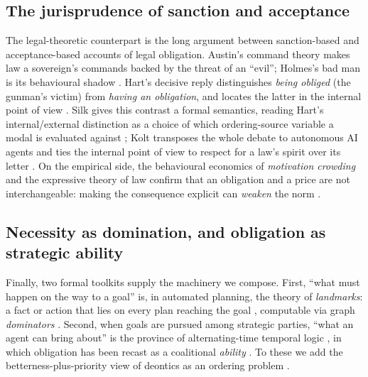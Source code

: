\subsection{The jurisprudence of sanction and acceptance}
The legal-theoretic counterpart is the long argument between sanction-based and
acceptance-based accounts of legal obligation. Austin's command theory makes law a
sovereign's commands backed by the threat of an ``evil''; Holmes's bad man is its
behavioural shadow . Hart's decisive reply distinguishes
\emph{being obliged} (the gunman's victim) from \emph{having an obligation}, and locates
the latter in the internal point of view . Silk gives this contrast a
formal semantics, reading Hart's internal/external distinction as a choice of which
ordering-source variable a modal is evaluated against ; Kolt transposes the
whole debate to autonomous AI agents and ties the internal point of view to respect for a
law's spirit over its letter . On the empirical side, the behavioural
economics of \emph{motivation crowding} and the expressive theory of law confirm that an
obligation and a price are not interchangeable: making the consequence explicit can
\emph{weaken} the norm .

\subsection{Necessity as domination, and obligation as strategic ability}
Finally, two formal toolkits supply the machinery we compose. First, ``what must happen on
the way to a goal'' is, in automated planning, the theory of \emph{landmarks}: a fact or
action that lies on every plan reaching the goal ,
computable via graph \emph{dominators} . Second, when goals
are pursued among strategic parties, ``what an agent can bring about'' is the province of
alternating-time temporal logic , in which
obligation has been recast as a coalitional \emph{ability} . To these we add the betterness-plus-priority view of deontics as an ordering
problem .

